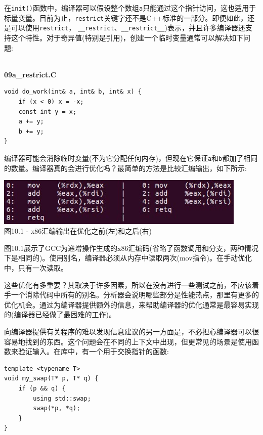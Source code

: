 在\texttt{init()}函数中，编译器可以假设整个数组\texttt{a}只能通过这个指针访问，这也适用于标量变量。目前为止，\texttt{restrict}关键字还不是C++标准的一部分。即便如此，还是可以使用\texttt{restrict}， \texttt{\_\_restrict}、\texttt{\_\_restrict\_\_})表示，并且许多编译器还支持这个特性。对于奇异值(特别是引用)，创建一个临时变量通常可以解决如下问题:

\hspace*{\fill} \\ %
\noindent
\textbf{09a\_restrict.C}
\begin{lstlisting}[style=styleCXX]
void do_work(int& a, int& b, int& x) {
	if (x < 0) x = -x;
	const int y = x;
	a += y;
	b += y;
}
\end{lstlisting}

编译器可能会消除临时变量(不为它分配任何内存)，但现在它保证\texttt{a}和\texttt{b}都加了相同的数量。编译器真的会进行优化吗？最简单的方法是比较汇编输出，如下所示:

\begin{center}
\includegraphics[width=0.9\textwidth]{content/3/chapter10/images/1.jpg}\\
图10.1 - x86汇编输出在优化之前(左)和之后(右)
\end{center}

图10.1展示了GCC为递增操作生成的x86汇编码(省略了函数调用和分支，两种情况下是相同的)。使用别名，编译器必须从内存中读取两次(mov指令)。在手动优化中，只有一次读取。

这些优化有多重要？其取决于许多因素，所以在没有进行一些测试之前，不应该着手一个消除代码中所有的别名。分析器会说明哪些部分是性能热点，那里有更多的优化机会。通过为编译器提供额外的信息，来帮助编译器的优化通常是最容易实现的(编译器已经做了最困难的工作)。 

向编译器提供有关程序的难以发现信息建议的另一方面是，不必担心编译器可以很容易地找到的东西。这个问题会在不同的上下文中出现，但更常见的场景是使用函数来验证输入。在库中，有一个用于交换指针的函数:

\begin{lstlisting}[style=styleCXX]
template <typename T>
void my_swap(T* p, T* q) {
	if (p && q) {
		using std::swap;
		swap(*p, *q);
	}
}
\end{lstlisting}

